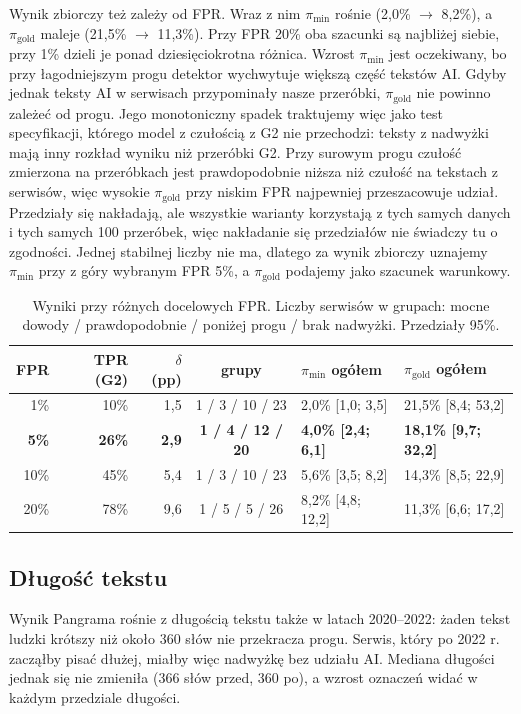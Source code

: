 \documentclass[11pt,a4paper]{article}
\newcommand{\pimin}{\ensuremath{\pi_{\mathrm{min}}}}
\newcommand{\pigold}{\ensuremath{\pi_{\mathrm{gold}}}}
\begin{document}
Wynik zbiorczy też zależy od FPR. Wraz z nim \pimin{} rośnie (2,0\% $\rightarrow$ 8,2\%), a \pigold{} maleje (21,5\% $\rightarrow$ 11,3\%). Przy FPR 20\% oba szacunki są najbliżej siebie, przy 1\% dzieli je ponad dziesięciokrotna różnica. Wzrost \pimin{} jest oczekiwany, bo przy łagodniejszym progu detektor wychwytuje większą część tekstów AI. Gdyby jednak teksty AI w serwisach przypominały nasze przeróbki, \pigold{} nie powinno zależeć od progu. Jego monotoniczny spadek traktujemy więc jako test specyfikacji, którego model z czułością z G2 nie przechodzi: teksty z nadwyżki mają inny rozkład wyniku niż przeróbki G2. Przy surowym progu czułość zmierzona na przeróbkach jest prawdopodobnie niższa niż czułość na tekstach z serwisów, więc wysokie \pigold{} przy niskim FPR najpewniej przeszacowuje udział. Przedziały się nakładają, ale wszystkie warianty korzystają z tych samych danych i tych samych 100 przeróbek, więc nakładanie się przedziałów nie świadczy tu o zgodności. Jednej stabilnej liczby nie ma, dlatego za wynik zbiorczy uznajemy \pimin{} przy z góry wybranym FPR 5\%, a \pigold{} podajemy jako szacunek warunkowy.

\begin{table}[t]
\centering\footnotesize
\caption{Wyniki przy różnych docelowych FPR. Liczby serwisów w grupach: mocne dowody / prawdopodobnie / poniżej progu / brak nadwyżki. Przedziały 95\%.}\label{tab:fpr}
\begin{tabular}{@{}rrrcll@{}}
\toprule
FPR & TPR (G2) & $\delta$ (pp) & grupy & \pimin{} ogółem & \pigold{} ogółem \\
\midrule
1\% & 10\% & 1,5 & 1 / 3 / 10 / 23 & 2,0\% [1,0; 3,5] & 21,5\% [8,4; 53,2] \\
\textbf{5\%} & \textbf{26\%} & \textbf{2,9} & \textbf{1 / 4 / 12 / 20} & \textbf{4,0\% [2,4; 6,1]} & \textbf{18,1\% [9,7; 32,2]} \\
10\% & 45\% & 5,4 & 1 / 3 / 10 / 23 & 5,6\% [3,5; 8,2] & 14,3\% [8,5; 22,9] \\
20\% & 78\% & 9,6 & 1 / 5 / 5 / 26 & 8,2\% [4,8; 12,2] & 11,3\% [6,6; 17,2] \\
\bottomrule
\end{tabular}
\end{table}

\subsection{Długość tekstu}\label{sec:dlugosc}

Wynik Pangrama rośnie z długością tekstu także w latach 2020--2022: żaden tekst ludzki krótszy niż około 360 słów nie przekracza progu. Serwis, który po 2022 r. zacząłby pisać dłużej, miałby więc nadwyżkę bez udziału AI. Mediana długości jednak się nie zmieniła (366 słów przed, 360 po), a wzrost oznaczeń widać w każdym przedziale długości.
\end{document}
